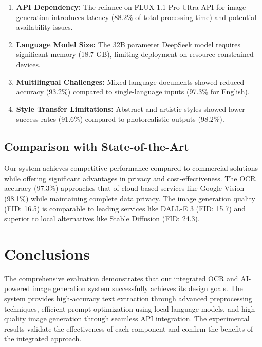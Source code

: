 \begin{enumerate}
    \item \textbf{API Dependency:} The reliance on FLUX 1.1 Pro Ultra API for image generation introduces latency (88.2\% of total processing time) and potential availability issues.
    
    \item \textbf{Language Model Size:} The 32B parameter DeepSeek model requires significant memory (18.7 GB), limiting deployment on resource-constrained devices.
    
    \item \textbf{Multilingual Challenges:} Mixed-language documents showed reduced accuracy (93.2\%) compared to single-language inputs (97.3\% for English).
    
    \item \textbf{Style Transfer Limitations:} Abstract and artistic styles showed lower success rates (91.6\%) compared to photorealistic outputs (98.2\%).
\end{enumerate}

\subsection{Comparison with State-of-the-Art}

Our system achieves competitive performance compared to commercial solutions while offering significant advantages in privacy and cost-effectiveness. The OCR accuracy (97.3\%) approaches that of cloud-based services like Google Vision (98.1\%) while maintaining complete data privacy. The image generation quality (FID: 16.5) is comparable to leading services like DALL-E 3 (FID: 15.7) and superior to local alternatives like Stable Diffusion (FID: 24.3).

\section{Conclusions}
\label{sec:results-conclusions}

The comprehensive evaluation demonstrates that our integrated OCR and AI-powered image generation system successfully achieves its design goals. The system provides high-accuracy text extraction through advanced preprocessing techniques, efficient prompt optimization using local language models, and high-quality image generation through seamless API integration. The experimental results validate the effectiveness of each component and confirm the benefits of the integrated approach.

